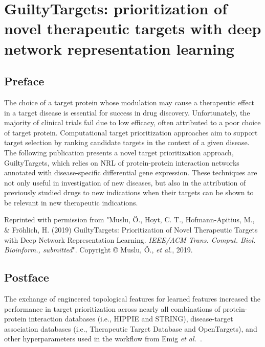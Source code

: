 \chapter{GuiltyTargets: prioritization of novel therapeutic targets with deep network representation learning}
\label{ch:guiltytargets}

\section*{Preface}

The choice of a target protein whose modulation may cause a therapeutic effect in a target disease is essential for success in drug discovery.
Unfortunately, the majority of clinical trials fail due to low efficacy, often attributed to a poor choice of target protein.
Computational target prioritization approaches aim to support target selection by ranking candidate targets in the context of a given disease.
The following publication presents a novel target prioritization approach, GuiltyTargets, which relies on \ac{NRL} of protein-protein interaction networks annotated with disease-specific differential gene expression.
These techniques are not only useful in investigation of new diseases, but also in the attribution of previously studied drugs to new indications when their targets can be shown to be relevant in new therapeutic indications.

\vspace*{\fill}

Reprinted with permission from "Muslu, Ö., Hoyt, C. T., Hofmann-Apitius, M., \& Fröhlich, H. (2019) GuiltyTargets: Prioritization of Novel Therapeutic Targets with Deep Network Representation Learning. \textit{IEEE/ACM Trans. Comput. Biol. Bioinform., submitted}".
Copyright © Muslu, Ö., \textit{et al.}, 2019.



\section*{Postface}

The exchange of engineered topological features for learned features increased the performance in target prioritization across nearly all combinations of protein-protein interaction databases (i.e., HIPPIE and STRING), disease-target association databases (i.e., Therapeutic Target Database and OpenTargets), and other hyperparameters used in the workflow from Emig \textit{et al.}~\cite{Emig2013}.

